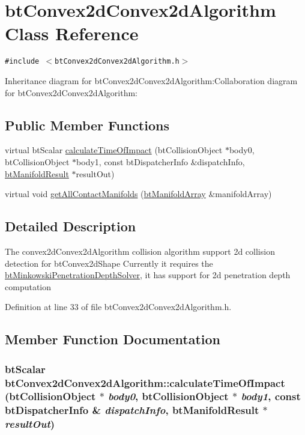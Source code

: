 \hypertarget{classbt_convex2d_convex2d_algorithm}{
\section{btConvex2dConvex2dAlgorithm Class Reference}
\label{classbt_convex2d_convex2d_algorithm}
}
{\tt \#include $<$btConvex2dConvex2dAlgorithm.h$>$}

Inheritance diagram for btConvex2dConvex2dAlgorithm:Collaboration diagram for btConvex2dConvex2dAlgorithm:\subsection*{Public Member Functions}
\begin{CompactItemize}
\item 
virtual btScalar \hyperlink{classbt_convex2d_convex2d_algorithm_32bf85e0246ed54dd41edd861294c37e}{calculateTimeOfImpact} (btCollisionObject $\ast$body0, btCollisionObject $\ast$body1, const btDispatcherInfo \&dispatchInfo, \hyperlink{classbt_manifold_result}{btManifoldResult} $\ast$resultOut)
\item 
virtual void \hyperlink{classbt_convex2d_convex2d_algorithm_de3af2f3f04d9b202535d33550a94be4}{getAllContactManifolds} (\hyperlink{classbt_aligned_object_array}{btManifoldArray} \&manifoldArray)
\end{CompactItemize}


\subsection{Detailed Description}
The convex2dConvex2dAlgorithm collision algorithm support 2d collision detection for btConvex2dShape Currently it requires the \hyperlink{classbt_minkowski_penetration_depth_solver}{btMinkowskiPenetrationDepthSolver}, it has support for 2d penetration depth computation 

Definition at line 33 of file btConvex2dConvex2dAlgorithm.h.

\subsection{Member Function Documentation}
\hypertarget{classbt_convex2d_convex2d_algorithm_32bf85e0246ed54dd41edd861294c37e}{
\subsubsection[calculateTimeOfImpact]{\setlength{\rightskip}{0pt plus 5cm}btScalar btConvex2dConvex2dAlgorithm::calculateTimeOfImpact (btCollisionObject $\ast$ {\em body0}, \/  btCollisionObject $\ast$ {\em body1}, \/  const btDispatcherInfo \& {\em dispatchInfo}, \/  {\bf btManifoldResult} $\ast$ {\em resultOut})}}
\label{classbt_convex2d_convex2d_algorithm_32bf85e0246ed54dd41edd861294c37e}




